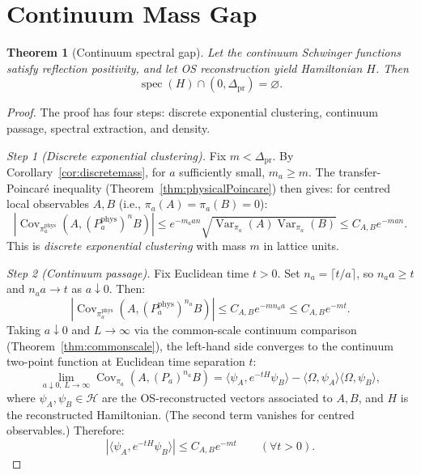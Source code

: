 \documentclass[12pt]{article}
\theoremstyle{plain}
\newtheorem{theorem}{Theorem}[section]
\theoremstyle{definition}
\numberwithin{equation}{section}
\newcommand{\Var}{\operatorname{Var}}
\newcommand{\Cov}{\operatorname{Cov}}
\newcommand{\spec}{\operatorname{spec}}
\newcommand{\pr}{\mathrm{pr}}
\newcommand{\phys}{\mathrm{phys}}
\begin{document}
\section{Continuum Mass Gap}\label{sec:continuumgap}

\begin{theorem}[Continuum spectral gap]\label{thm:continuumgap}
Let the continuum Schwinger functions satisfy reflection positivity, and let OS reconstruction yield Hamiltonian $H$.  Then
\begin{equation}
\boxed{\spec(H)\cap(0,\Delta_{\pr}) = \varnothing.}
\end{equation}
\end{theorem}

\begin{proof}
The proof has four steps: discrete exponential clustering, continuum passage, spectral extraction, and density.

\emph{Step 1 (Discrete exponential clustering).}
Fix $m<\Delta_{\pr}$.  By Corollary~\ref{cor:discretemass}, for $a$ sufficiently small, $m_a\geq m$.  The transfer-Poincar\'e inequality (Theorem~\ref{thm:physicalPoincare}) then gives: for centred local observables $A,B$ (i.e., $\pi_a(A)=\pi_a(B)=0$):
\begin{equation}
|\Cov_{\pi_a^{\phys}}(A,(P_a^{\phys})^n B)| \leq e^{-m_a an}\sqrt{\Var_{\pi_a}(A)\Var_{\pi_a}(B)} \leq C_{A,B}e^{-man}.
\end{equation}
This is \emph{discrete exponential clustering} with mass $m$ in lattice units.

\emph{Step 2 (Continuum passage).}
Fix Euclidean time $t>0$.  Set $n_a=\lceil t/a\rceil$, so $n_a a\geq t$ and $n_a a\to t$ as $a\downarrow 0$.  Then:
\begin{equation}
|\Cov_{\pi_a^{\phys}}(A,(P_a^{\phys})^{n_a}B)| \leq C_{A,B}e^{-mn_a a} \leq C_{A,B}e^{-mt}.
\end{equation}
Taking $a\downarrow 0$ and $L\to\infty$ via the common-scale continuum comparison (Theorem~\ref{thm:commonscale}), the left-hand side converges to the continuum two-point function at Euclidean time separation $t$:
\begin{equation}
\lim_{a\downarrow 0,\,L\to\infty}\Cov_{\pi_a}(A,(P_a)^{n_a}B) = \langle\psi_A,e^{-tH}\psi_B\rangle - \langle\Omega,\psi_A\rangle\langle\Omega,\psi_B\rangle,
\end{equation}
where $\psi_A,\psi_B\in\mathcal{H}$ are the OS-reconstructed vectors associated to $A,B$, and $H$ is the reconstructed Hamiltonian.  (The second term vanishes for centred observables.)  Therefore:
\begin{equation}\label{eq:continuumbound}
|\langle\psi_A,e^{-tH}\psi_B\rangle| \leq C_{A,B}e^{-mt}\qquad(\forall t>0).
\end{equation}


\end{proof}
\end{document}
